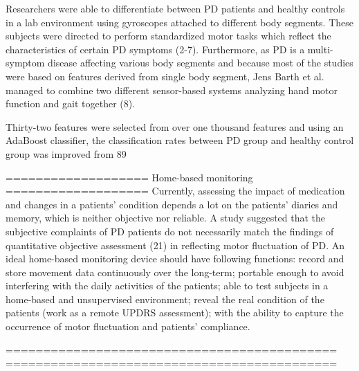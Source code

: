 Researchers were able to differentiate between PD patients and healthy controls in a lab environment using gyroscopes attached to different body segments. These subjects were directed to perform standardized motor tasks which reflect the characteristics of certain PD symptoms (2-7). Furthermore,
as PD is a multi-symptom disease affecting various body segments and because most of the studies were based on features derived from single body segment, Jens Barth et al. managed to combine two different sensor-based systems analyzing hand motor function and gait together (8).

Thirty-two features were selected from over one thousand features and using an AdaBoost classifier, the classification rates between PD group and healthy control group was improved from 89%

===================
Home-based monitoring
===================
Currently, assessing the impact of medication and changes in a patients’ condition depends a lot on the patients’ diaries and memory, which is neither objective nor reliable. A study suggested that the subjective complaints of PD patients do not necessarily match the findings of quantitative objective
assessment (21) in reflecting motor fluctuation of PD. An ideal home-based monitoring device should have following functions: record and store movement data continuously over the long-term; portable enough to avoid interfering with the daily activities of the patients; able to test subjects in a home-based and unsupervised environment; reveal the real condition of the patients (work as a remote UPDRS assessment); with the ability to capture the occurrence of
motor fluctuation and patients’ compliance.


============================================
============================================













